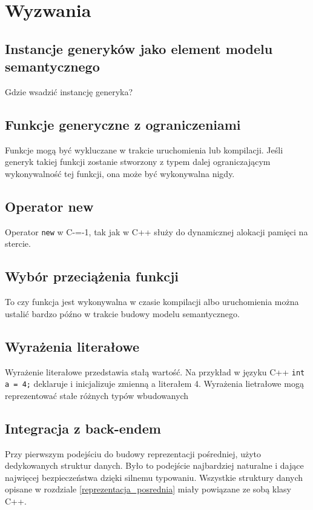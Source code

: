 \section{Wyzwania}
\subsection{Instancje generyków jako element modelu semantycznego}
Gdzie wsadzić instancję generyka?

\subsection{Funkcje generyczne z ograniczeniami}

Funkcje mogą być wykluczane w trakcie uruchomienia lub kompilacji. Jeśli generyk takiej funkcji zostanie stworzony z typem dalej ograniczającym wykonywalność tej funkcji, ona może być wykonywalna nigdy.

\subsection{Operator new}

Operator \texttt{new} w C-=-1, tak jak w C++ służy do dynamicznej alokacji pamięci na stercie.


\subsection{Wybór przeciążenia funkcji}
To czy funkcja jest wykonywalna w czasie kompilacji albo uruchomienia można ustalić bardzo późno w trakcie budowy modelu semantycznego.

\subsection{Wyrażenia literałowe}

Wyrażenie literałowe przedstawia stałą wartość.
Na przykład w języku C++ \texttt{int a = 4;} deklaruje i inicjalizuje zmienną a literałem 4.
Wyrażenia lietrałowe mogą reprezentować stałe różnych typów wbudowanych 

\subsection{Integracja z back-endem}
Przy pierwszym podejściu do budowy reprezentacji pośredniej, użyto dedykowanych struktur danych. Było to podejście najbardziej naturalne i dające najwięcej bezpieczeństwa dzięki silnemu typowaniu. Wszystkie struktury danych opisane w rozdziale \ref{reprezentacja_posrednia} miały powiązane ze sobą klasy C++.


